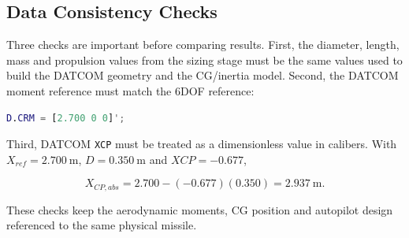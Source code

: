 \subsection{Data Consistency Checks}

Three checks are important before comparing results. First, the diameter, length, mass and propulsion values from the sizing stage must be the same values used to build the DATCOM geometry and the CG/inertia model. Second, the DATCOM moment reference must match the 6DOF reference:

\begin{lstlisting}[language=Matlab]
D.CRM = [2.700 0 0]';
\end{lstlisting}

Third, DATCOM \texttt{XCP} must be treated as a dimensionless value in calibers. With \(X_{ref}=2.700~\text{m}\), \(D=0.350~\text{m}\) and \(XCP=-0.677\),

\[
    X_{CP,abs}=2.700-(-0.677)(0.350)=2.937~\text{m}.
\]

These checks keep the aerodynamic moments, CG position and autopilot design referenced to the same physical missile.
